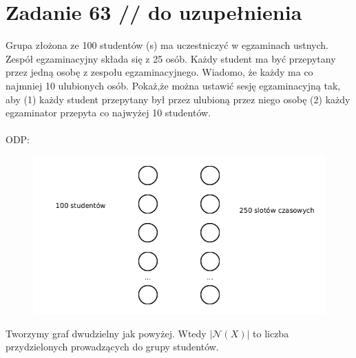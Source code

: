 \documentclass{article}
\begin{document}
\section{\centering Zadanie 63 // do uzupełnienia}
Grupa złożona ze 100 studentów (s) ma uczestniczyć w egzaminach ustnych. Zespół egzaminacyjny składa się z 25 osób. Każdy student ma być przepytany przez jedną osobę z zespołu egzaminacyjnego. Wiadomo, że każdy ma co najmniej 10 ulubionych osób. Pokaż,że można ustawić sesję egzaminacyjną tak, aby (1) każdy student przepytany był przez ulubioną przez niego osobę (2) każdy egzaminator przepyta co najwyżej 10 studentów.\\\\
ODP:\\
\begin{figure}[H]
	\centering
	\includegraphics[width=0.5\linewidth]{z63.png}  
\end{figure}
Tworzymy graf dwudzielny jak powyżej. Wtedy $|\mathcal{N}(X)|$ to liczba przydzielonych prowadzących do grupy studentów.
\end{document}
